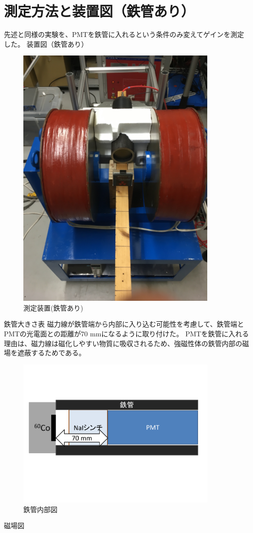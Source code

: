 \section{測定方法と装置図（鉄管あり）}
先述と同様の実験を、PMTを鉄管に入れるという条件のみ変えてゲインを測定した。
装置図（鉄管あり）
\begin{figure}[H]
	\centering
		\includegraphics[width=10cm]{fig/iguchi/2inchinFe.jpg}
	\caption{測定装置(鉄管あり)}
	\label{2inchinFe}
\end{figure}

鉄管大きさ表
磁力線が鉄管端から内部に入り込む可能性を考慮して、鉄管端とPMTの光電面との距離が70 mmになるように取り付けた。
PMTを鉄管に入れる理由は、磁力線は磁化しやすい物質に吸収されるため、強磁性体の鉄管内部の磁場を遮蔽するためである。
\begin{figure}[H]
	\centering
		\includegraphics[width=10cm]{fig/iguchi/PMTinFe.pdf}
	\caption{鉄管内部図}
	\label{PMTinFe}
\end{figure}
磁場図


